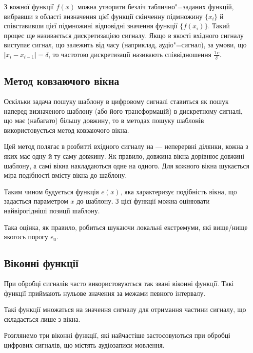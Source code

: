     З кожної функції $f(x)$ можна утворити безліч таблично"=заданих функцій, вибравши з області визначення цієї
    функції скінченну підмножину $\{x_i\}$ й співставивши цієї підмножині відповідні значення функції $\{f(x_i)\}$.
    Такий процес ще називається дискретизацією сигналу.
    Якщо в якості вхідного сигналу виступає сигнал, що залежить від часу (наприклад, аудіо"=сигнал), за умови, що $|
    x_i - x_{i-1}| = \delta$, то частотою дискретизації називають співвідношення $\frac{1\,c}{\delta}$.

    \subsection{Метод ковзаючого вікна}
    \label{ss:sliding-window}
        Оскільки задача пошуку шаблону в цифровому сигналі ставиться як пошук наперед визначеного шаблону (або його
        трансформацій) в дискретному сигналі, що має (набагато) більшу довжину, то в методах пошуку шаблонів
        використовується метод ковзаючого вікна.

        Цей метод полягає в розбитті вхідного сигналу на  --- неперервні ділянки, кожна з яких має
        одну й ту саму довжину.
        Як правило, довжина вікна дорівнює довжині шаблону, а самі вікна накладаються одне на одного.
        Для кожного вікна шукається міра подібності вмісту вікна до шаблону.

        Таким чином будується функція $e(x)$, яка характеризує подібність вікна, що задається параметром $x$ до
        шаблону.
        З цієї функції можна оцінювати найвірогідніші позиції шаблону.

        Така оцінка, як правило, робиться шукаючи локальні екстремуми, які вище/нище якогось порогу $e_{0}$.

    \subsection{Віконні функції}
    \label{ss:window-functions}
        При обробці сигналів часто використовуються так звані віконні функції.
        Такі функції приймають нульове значення за межами певного інтервалу.

        Такі функції множаться на значення сигналу для отримання частини сигналу, що складається лише з вікна.

        Розглянемо три віконні функції, які найчастіше застосовуються при обробці цифрових сигналів, що містять
        аудіозаписи мовлення.

